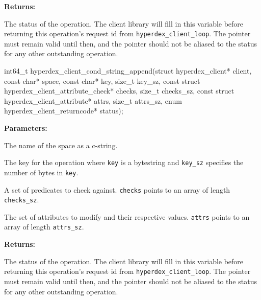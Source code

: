 \noindent\textbf{Returns:}
\begin{description}[labelindent=\widthof{{\texttt{status}}},leftmargin=*,noitemsep,nolistsep,align=right]
\item[\texttt{status}] The status of the operation.  The client library will fill in this variable before returning this operation's request id from \texttt{hyperdex\_client\_loop}.  The pointer must remain valid until then, and the pointer should not be aliased to the status for any other outstanding operation.
\end{description}

\funcsep
{}
\begin{ccode}
int64_t hyperdex_client_cond_string_append(struct hyperdex_client* client,
                const char* space,
                const char* key, size_t key_sz,
                const struct hyperdex_client_attribute_check* checks, size_t checks_sz,
                const struct hyperdex_client_attribute* attrs, size_t attrs_sz,
                enum hyperdex_client_returncode* status);
\end{ccode}
\funcdesc 

\noindent\textbf{Parameters:}
\begin{description}[labelindent=\widthof{{\texttt{checks}, \texttt{checks\_sz}}},leftmargin=*,noitemsep,nolistsep,align=right]
\item[\texttt{space}] The name of the space as a c-string.
\item[\texttt{key}, \texttt{key\_sz}] The key for the operation where \texttt{key} is a bytestring and \texttt{key\_sz} specifies the number of bytes in \texttt{key}.
\item[\texttt{checks}, \texttt{checks\_sz}] A set of predicates to check against.  \texttt{checks} points to an array of length \texttt{checks\_sz}.
\item[\texttt{attrs}, \texttt{attrs\_sz}] The set of attributes to modify and their respective values.  \texttt{attrs} points to an array of length \texttt{attrs\_sz}.
\end{description}

\noindent\textbf{Returns:}
\begin{description}[labelindent=\widthof{{\texttt{status}}},leftmargin=*,noitemsep,nolistsep,align=right]
\item[\texttt{status}] The status of the operation.  The client library will fill in this variable before returning this operation's request id from \texttt{hyperdex\_client\_loop}.  The pointer must remain valid until then, and the pointer should not be aliased to the status for any other outstanding operation.
\end{description}

